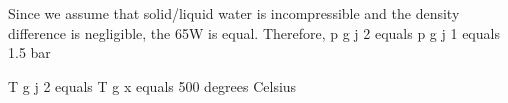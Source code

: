 Since we assume that solid/liquid water is incompressible and the density difference is negligible, the 65W is equal. Therefore, p g j 2 equals p g j 1 equals 1.5 bar  

T g j 2 equals T g x equals 500 degrees Celsius